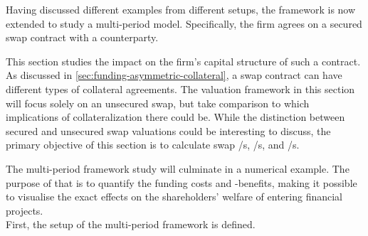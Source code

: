 \documentclass[main.tex]{subfiles}
\begin{document}
    Having discussed different examples from different setups,
    the framework is now extended to study a multi-period model.
    Specifically, the firm agrees on a secured swap contract with a counterparty.
    
    This section studies the impact on the firm's capital structure of such a contract.
    As discussed in \cref{sec:funding-asymmetric-collateral}, a swap contract can have different types of collateral agreements.
    The valuation framework in this section will focus solely on an unsecured swap,
    but take comparison to which implications of collateralization there could be.
    While the distinction between secured and unsecured swap valuations could be interesting to discuss,
    the primary objective of this section is to calculate swap \FVA/s, \CVA/s, and \DVA/s.

    The multi-period framework study will culminate in a numerical example.
    The purpose of that is to quantify the funding costs and -benefits,
    making it possible to visualise the exact effects on the shareholders' welfare of entering financial projects.
    \\
    First, the setup of the multi-period framework is defined.
\end{document}
